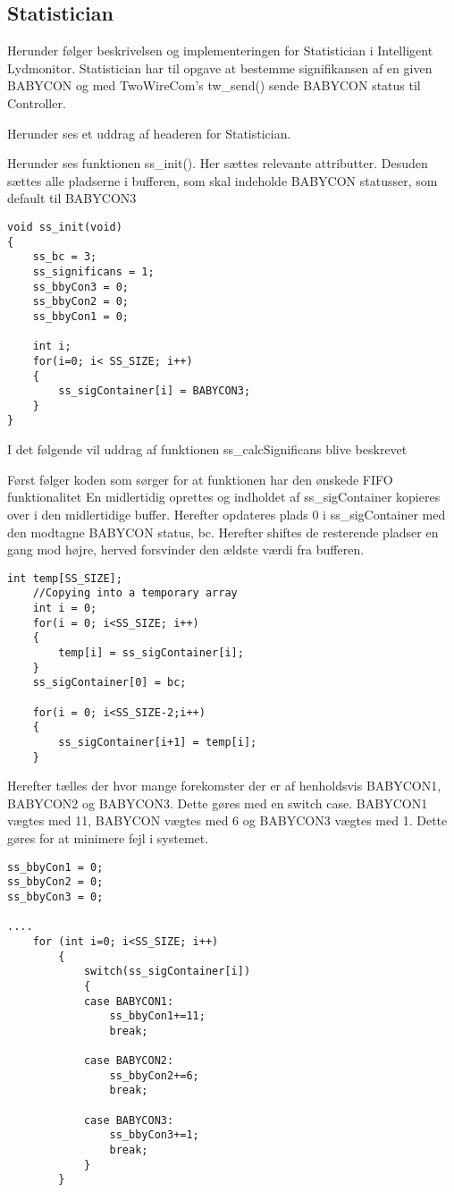 \subsection{Statistician}
Herunder følger beskrivelsen og implementeringen for Statistician i Intelligent Lydmonitor.
Statistician har til opgave at bestemme signifikansen af en given BABYCON og med TwoWireCom's tw\_send() sende BABYCON status til Controller. 

Herunder ses et uddrag af headeren for Statistician. 


Herunder ses funktionen ss\_init(). Her sættes relevante attributter. Desuden sættes alle pladserne i bufferen, som skal indeholde BABYCON statusser, som default til BABYCON3

\begin{verbatim}
void ss_init(void)
{
	ss_bc = 3;
	ss_significans = 1;
	ss_bbyCon3 = 0;
	ss_bbyCon2 = 0;
	ss_bbyCon1 = 0;

	int i;
	for(i=0; i< SS_SIZE; i++)
	{
		ss_sigContainer[i] = BABYCON3;
	}
}
\end{verbatim}

I det følgende vil uddrag af funktionen ss\_calcSignificans blive beskrevet 

Først følger koden som sørger for at funktionen har den ønskede FIFO funktionalitet
En midlertidig oprettes og indholdet af ss\_sigContainer kopieres over i den midlertidige buffer. 
Herefter opdateres plads 0 i ss\_sigContainer med den modtagne BABYCON status, bc. Herefter shiftes de resterende pladser en gang mod højre, herved forsvinder den ældste værdi fra bufferen. 

\begin{verbatim}
int temp[SS_SIZE];
	//Copying into a temporary array
	int i = 0;
	for(i = 0; i<SS_SIZE; i++)
	{
		temp[i] = ss_sigContainer[i];
	}
	ss_sigContainer[0] = bc;

	for(i = 0; i<SS_SIZE-2;i++)
	{
		ss_sigContainer[i+1] = temp[i];
	}
\end{verbatim}

Herefter tælles der hvor mange forekomster der er af henholdsvis BABYCON1, BABYCON2 og BABYCON3. Dette gøres med en switch case. BABYCON1 vægtes med 11, BABYCON vægtes med 6 og BABYCON3 vægtes med 1. Dette gøres for at minimere fejl i systemet. 

\begin{verbatim}
ss_bbyCon1 = 0;
ss_bbyCon2 = 0;
ss_bbyCon3 = 0;

....
	for (int i=0; i<SS_SIZE; i++)
		{
			switch(ss_sigContainer[i])
			{
			case BABYCON1:
				ss_bbyCon1+=11;
				break;

			case BABYCON2:
				ss_bbyCon2+=6;
				break;

			case BABYCON3:
				ss_bbyCon3+=1;
				break;
			}
		}
\end{verbatim}

